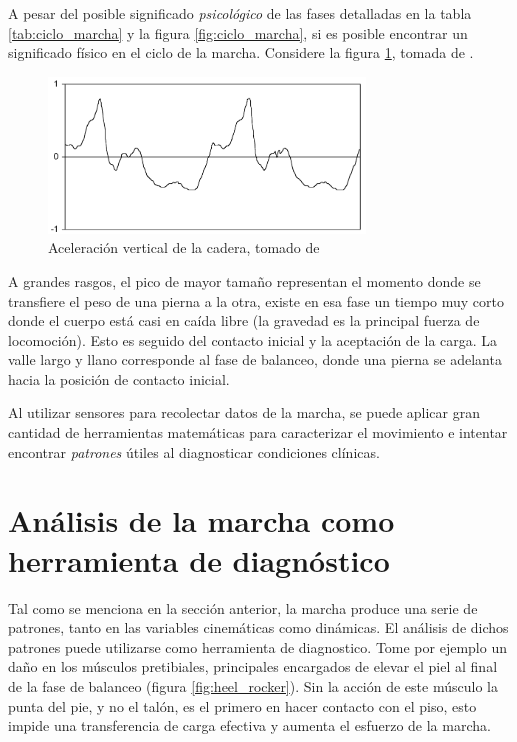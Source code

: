 A pesar del posible significado \emph{psicológico} de las fases detalladas en la tabla \ref{tab:ciclo_marcha} y la figura \ref{fig:ciclo_marcha}, si es posible encontrar un significado físico en el ciclo de la marcha. Considere la figura \ref{fig:menz_acc_ver}, tomada de \citep{menz}.

\begin{figure}
    \centering
    \includegraphics[width = 0.75\textwidth]{imagenes/menz_acceleration}
    \caption{Aceleración vertical de la cadera, tomado de \citep{menz}}
    \label{fig:menz_acc_ver}
\end{figure}

A grandes rasgos, el pico de mayor tamaño representan el momento donde se transfiere el peso de una pierna a la otra, existe en esa fase un tiempo muy corto donde el cuerpo está casi en caída libre (la gravedad es la principal fuerza de locomoción). Esto es seguido del contacto inicial y la aceptación de la carga. La valle largo y llano corresponde al fase de balanceo, donde una pierna se adelanta hacia la posición de contacto inicial.

Al utilizar sensores para recolectar datos de la marcha, se puede aplicar gran cantidad de herramientas matemáticas para caracterizar el movimiento e intentar encontrar \emph{patrones} útiles al diagnosticar condiciones clínicas. 





\section[Herramienta de diagnóstico]{Análisis de la marcha como herramienta de diagnóstico}

Tal como se menciona en la sección anterior, la marcha produce una serie de patrones, tanto en las variables cinemáticas como dinámicas. El análisis de dichos patrones puede utilizarse como herramienta de diagnostico. Tome por ejemplo un daño en los músculos pretibiales, principales encargados de elevar el piel al final de la fase de balanceo (figura \ref{fig:heel_rocker}). Sin la acción de este músculo la punta del pie, y no el talón, es el primero en hacer contacto con el piso, esto impide una transferencia de carga efectiva y aumenta el esfuerzo de la marcha.

